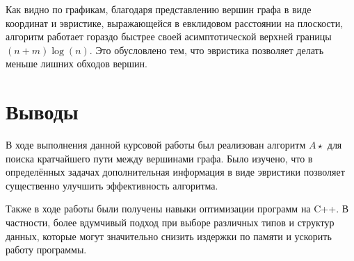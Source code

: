 \documentclass[12pt]{article}
\begin{document}
Как видно по графикам, благодаря представлению вершин графа в виде координат и эвристике, выражающейся в евклидовом расстоянии на плоскости, алгоритм работает гораздо быстрее своей асимптотической верхней границы $(n+m)\log(n)$. Это обусловлено тем, что эвристика позволяет делать меньше лишних обходов вершин.

\newpage
\section*{Выводы}
В ходе выполнения данной курсовой работы был реализован алгоритм $A\star$ для поиска кратчайшего пути между вершинами графа. Было изучено, что в определённых задачах дополнительная информация в виде эвристики позволяет существенно улучшить эффективность алгоритма.

Также в ходе работы были получены навыки оптимизации программ на C++. В частности, более вдумчивый подход при выборе различных типов и структур данных, которые могут значительно снизить издержки по памяти и ускорить работу программы.
\end{document}
